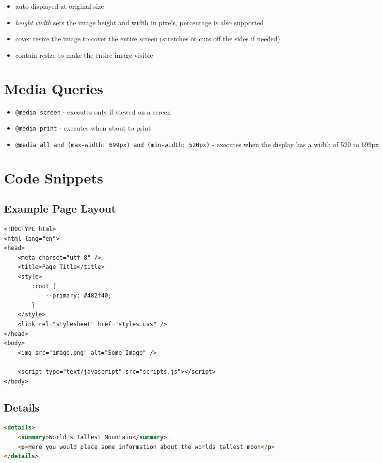 \documentclass[12pt, a4paper]{article}
\begin{document}
\begin{multicols*}{2}
\begin{description}
			\begin{itemize}
				\item auto
				\subitem displayed at original size
				\item \textit{height} \textit{width}
				\subitem sets the image height and width in pixels, percentage is also supported
				\item cover
				\subitem resize the image to cover the entire screen (stretches or cuts off the sides if needed)
				\item contain
				\subitem resize to make the entire image visible
			\end{itemize}
		\end{description}
		
		\section{Media Queries}
		\begin{itemize}
			\item\texttt{@media screen} - executes only if viewed on a screen
			\item\texttt{@media print} - executes when about to print
			\item\texttt{@media all and (max-width: 699px) and (min-width: 520px)} - executes when the display has a width of 520 to 699px
		\end{itemize}
		
	\end{multicols*}
		
	\section{Code Snippets}

	\subsection{Example Page Layout}
	\begin{lstlisting}
<!DOCTYPE html>
<html lang="en">
<head>
	<meta charset="utf-8" />
	<title>Page Title</title>
	<style>
		:root {
			--primary: #482f40;
		}
	</style>
	<link rel="stylesheet" href="styles.css" />
</head>
<body>
	<img src="image.png" alt="Some Image" />

	<script type="text/javascript" src="scripts.js"></script>
</body>	
	\end{lstlisting}
	

	\subsection{Details}
	\begin{lstlisting}[language=html]
<details>
	<summary>World's Tallest Mountain</summary>
	<p>Here you would place some information about the worlds tallest moon</p>
</details>
	\end{lstlisting}
\end{document}

